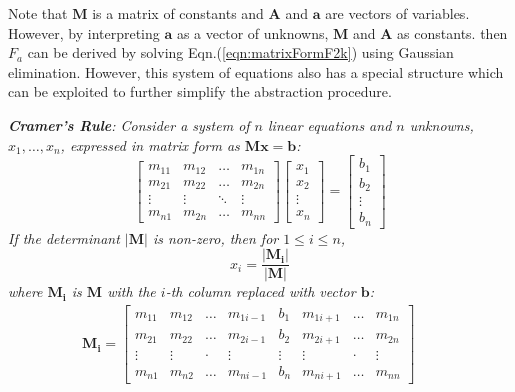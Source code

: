Note that $\mathbf{M}$ is a matrix of constants and $\mathbf{A}$ and $\mathbf{a}$ are
vectors of variables.
However, by interpreting $\mathbf{a}$ as a vector of unknowns, $\mathbf{M}$ and $\mathbf{A}$ as constants. 
then $F_a$ can be derived by solving Eqn.(\ref{eqn:matrixFormF2k}) using Gaussian 
elimination. However, this system of equations also has a special structure which can
be exploited to further simplify the abstraction procedure.

\begin{Definition}
{\it {\bf Cramer's Rule}: Consider a system of $n$ linear equations and $n$ unknowns,
$x_1,\dots,x_n$, expressed in matrix form as $\mathbf{Mx=b}$:
\begin{equation}
\begin{bmatrix}
m_{11} & m_{12} & \dots  & m_{1n} \\
m_{21} & m_{22} & \dots  & m_{2n} \\
\vdots & \vdots & \ddots & \vdots \\
m_{n1} & m_{2n} & \dots  & m_{nn}
\end{bmatrix}
\begin{bmatrix}
x_1 \\ x_2 \\ \vdots \\ x_n
\end{bmatrix}
 = 
\begin{bmatrix}
b_1 \\ b_2 \\ \vdots \\ b_n
\end{bmatrix}
\end{equation}
If the determinant $|\mathbf{M}|$ is non-zero, then for $1\leq i \leq n$,
\begin{equation}
x_i = \frac{|\mathbf{M_i}|}{|\mathbf{M}|}
\end{equation}
where $\mathbf{M_i}$ is $\mathbf{M}$ with the $i$-th column replaced with 
vector $\mathbf{b}$:
\begin{eqnarray}
\mathbf{M_i} = 
\begin{bmatrix}
m_{11} & m_{12} & \dots  & m_{1i-1} & b_{1}  & m_{1i+1} & \dots & m_{1n} \\
m_{21} & m_{22} & \dots  & m_{2i-1} & b_{2}  & m_{2i+1} & \dots & m_{2n} \\
\vdots & \vdots & \cdot  & \vdots   & \vdots & \vdots   & \cdot & \vdots \\
m_{n1} & m_{n2} & \dots  & m_{ni-1} & b_{n}  & m_{ni+1} & \dots & m_{nn}
\end{bmatrix} & &
\end{eqnarray}
}
\end{Definition}

